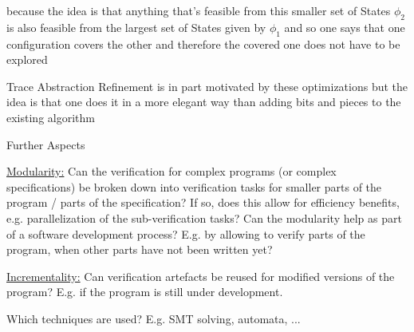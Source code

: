 \documentclass[a4paper]{article}
\begin{document}
\begin{minipage}[t]{0.16\linewidth}
\begin{betterlist}
\begin{betterlist}
{{\begin{betterlist}
\begin{betterlist}
							\begin{betterlist}
								\item because the idea is that anything that's feasible from this smaller set of States $\phi_2$ is also feasible from the largest set of States given by $\phi_1$ and so one says that one configuration covers the other and therefore the covered one does not have to be explored
							\end{betterlist}
						\end{betterlist}
						\item Trace Abstraction Refinement is in part motivated by these optimizations but the idea is that one does it in a more elegant way than adding bits and pieces to the existing algorithm
					\end{betterlist}
				}}
		\end{betterlist}
		\item \alert{Further Aspects}
		\begin{betterlist}
			\item \underline{Modularity:} Can the verification for complex programs (or complex specifications) be broken down into verification tasks for smaller parts of the program / parts of the specification? If so, does this allow for efficiency benefits, e.g. parallelization of the sub-verification tasks? Can the modularity help as part of a software development process? E.g. by allowing to verify parts of the program, when other parts have not been written yet?

			\item \underline{Incrementality:} Can verification artefacts be reused for modified versions of the program? E.g. if the program is still under development.

			\item Which techniques are used? E.g. SMT solving, automata, ...


\end{betterlist}
\end{betterlist}
\end{minipage}
\end{document}
